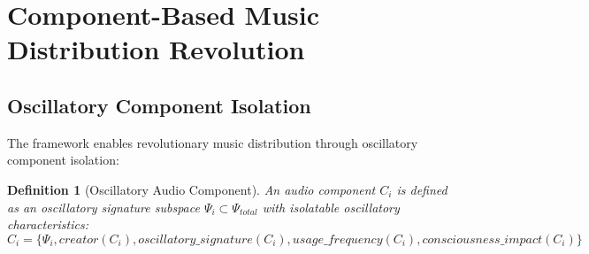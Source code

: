 \documentclass[12pt,a4paper]{article}
\newtheorem{definition}{Definition}
\begin{document}
\section{Component-Based Music Distribution Revolution}

\subsection{Oscillatory Component Isolation}

The framework enables revolutionary music distribution through oscillatory component isolation:

\begin{definition}[Oscillatory Audio Component]
An audio component $C_i$ is defined as an oscillatory signature subspace $\Psi_i \subset \Psi_{total}$ with isolatable oscillatory characteristics:
\begin{equation}
C_i = \{\Psi_i, creator(C_i), oscillatory\_signature(C_i), usage\_frequency(C_i), consciousness\_impact(C_i)\}
\end{equation}
\end{definition}
\end{document}
